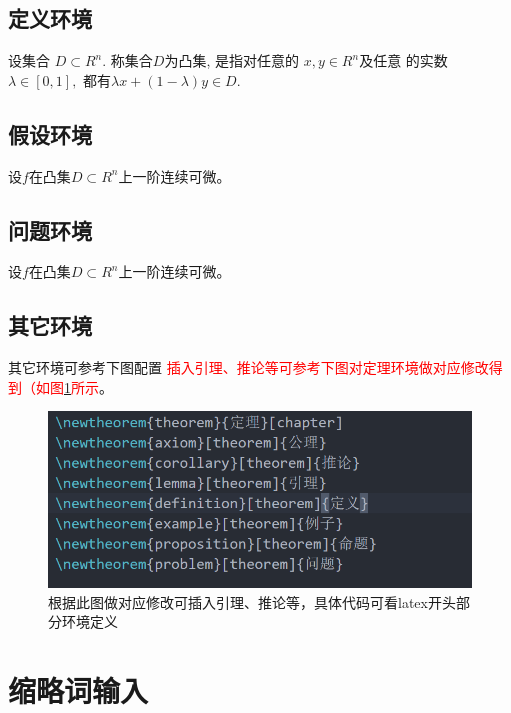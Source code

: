 \subsection{定义环境}
\begin{definition}
设集合 $D \subset {R^n}.$ 称集合$D$为凸集, 是指对任意的 $x,y \in {R^n}$及任意
的实数$\lambda  \in [0,1],$ 都有$\lambda x + (1 - \lambda )y \in D.$
\end{definition}

\subsection{假设环境}
\begin{assumption}
设$f$在凸集$D \subset {R^n}$上一阶连续可微。
\end{assumption}
\subsection{问题环境}
\begin{problem}
  设$f$在凸集$D \subset {R^n}$上一阶连续可微。
  \end{problem}

\subsection{其它环境}
其它环境可参考下图配置
\textcolor{red}{插入引理、推论等可参考下图对定理环境做对应修改得到（如图\ref{fig_定理环境}所示}。
 \begin{figure}[!htb]
  \centering
  \includegraphics[width=1\textwidth]{manual/figures/定理环境}
  \caption{根据此图做对应修改可插入引理、推论等，具体代码可看latex开头部分环境定义}
  \label{fig_定理环境}
\end{figure}



\section{缩略词输入}

